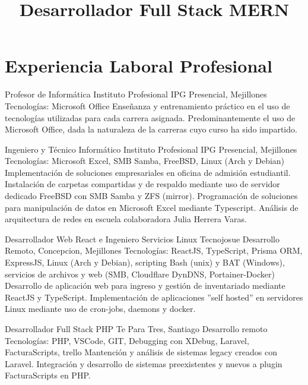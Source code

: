 \documentclass[draft,color,12pt,letterpaper,sans]{moderncv}
\title{Desarrollador Full Stack MERN}
\begin{document}
\makecvtitle %

\section{Experiencia Laboral Profesional}



{Profesor de Inform\'atica}
{Instituto Profesional IPG}
{\newline Presencial, Mejillones}
{\newline Tecnolog\'ias: Microsoft Office}
{Enseñanza y entrenamiento pr\'actico en el uso de tecnolog\'ias utilizadas para cada carrera asignada. Predominantemente el uso de Microsoft Office, dada la naturaleza de la carreras cuyo curso ha sido impartido.\newline}

{Ingeniero y T\'ecnico Inform\'atico}
{Instituto Profesional IPG}
{\newline Presencial, Mejillones}
{\newline Tecnolog\'ias: Microsoft Excel, SMB Samba, FreeBSD, Linux (Arch y Debian)}
{Implementaci\'on de soluciones empresariales en oficina de  admisi\'on estudiantil. Instalaci\'on de carpetas compartidas y de respaldo mediante uso de servidor dedicado FreeBSD con SMB Samba y ZFS (mirror). Programaci\'on de soluciones para manipulaci\'on de datos en Microsoft Excel mediante Typescript. An\'alisis de arquitectura de redes en escuela colaboradora Julia Herrera Varas.\newline}


{Desarrollador Web React e Ingeniero Servicios Linux}
{Tecnojosue}
{\newline Desarrollo Remoto, Concepcion, Mejillones}
{\newline Tecnolog\'ias:  ReactJS, TypeScript, Prisma ORM, ExpressJS, Linux (Arch y Debian), scripting Bash (unix) y BAT (Windows), servicios de archivos y web (SMB, Cloudflare DynDNS, Portainer-Docker)}
{Desarrollo de aplicación web para ingreso y gestión de inventariado mediante ReactJS y TypeScript. Implementación de aplicaciones ”self hosted” en servidores Linux mediante uso de cron-jobs, daemons y docker.\newline}

{Desarrollador Full Stack PHP}
{Te Para Tres, Santiago}
{\newline Desarrollo remoto}
{\newline Tecnolog\'ias: PHP, VSCode, GIT, Debugging con XDebug, Laravel, FacturaScripts, trello}
{Mantenci\'on y an\'alisis de sistemas legacy creados con Laravel. Integraci\'on y desarrollo de sistemas preexistentes y nuevos a plugin FacturaScripts en PHP.\newline}
\end{document}
